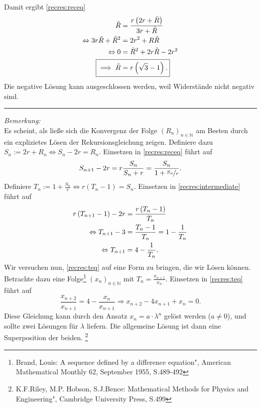 \documentclass[a4paper]{article}
\numberwithin{equation}{Exercise}
\numberwithin{figure}{Exercise}
\begin{document}
\begin{Answer}[ref = recres]
	Damit ergibt \eqref{recres:receq}
	\begin{align*}
	\tilde{R}  &= \frac{r\left(2r+\tilde{R}\right)}{3r+\tilde{R}}\\
	\Leftrightarrow 3r\tilde{R} + \tilde{R}^2 &= 2r^2 + R\tilde{R}\\
	\Leftrightarrow 0&=\tilde{R}^2 + 2r\tilde{R} - 2r^2 \\
	\Aboxed{\implies \tilde{R} &= r\left(\sqrt{3}-1\right).}
	\end{align*}
	Die negative Lösung kann ausgeschlossen werden, weil Widerstände nicht negativ sind.\\
	\noindent\rule{\textwidth}{.75pt}
	\textit{Bemerkung:} \\
	Es scheint, als ließe sich die Konvergenz der Folge $\left(R_n\right)_{n\in \mathbb{N}}$ am Besten durch ein explizietes Lösen der Rekursionsgleichung zeigen.
	Definiere dazu $S_n := 2r + R_n \Leftrightarrow S_n - 2r = R_n$. Einsetzen in \eqref{recres:receq} führt auf 
	\begin{equation}\label{recres:intermediate}
	S_{n+1} - 2r = r\frac{S_n}{S_n+r} = \frac{S_n}{1+\nicefrac{S_n}{r}}.
	\end{equation}
	Definiere $T_n := 1+\frac{S_n}{r} \Leftrightarrow r\left(T_n-1\right) = S_n$. Einsetzen in \eqref{recres:intermediate} führt auf 
	\begin{align}\label{recres:teq}
	r\left(T_{n+1}-1\right) - 2r &= \frac{r\left(T_n-1\right)}{T_n}\notag\\
	\Leftrightarrow T_{n+1}-3 &= \frac{T_n-1}{T_n} = 1 -\frac{1}{T_n}\notag\\
	\Leftrightarrow T_{n+1} &= 4 - \frac{1}{T_n}.
	\end{align}
	Wir versuchen nun, \eqref{recres:teq} auf eine Form zu bringen, die wir Lösen können. Betrachte dazu eine Folge\footnote[2]{Brand, Louis: \glqq A sequence defined by a difference equation", American Mathematical Monthly 62, September 1955, S.489-492} $\left(x_n\right)_{n\in \mathbb{N}}$ mit $T_n = \frac{x_{n+1}}{x_n}$. Einsetzen in \eqref{recres:teq} führt auf 
	\begin{equation}
	\frac{x_{n+2}}{x_{n+1}} = 4 - \frac{x_n}{x_{n+1}} \Rightarrow x_{n+2} - 4x_{n+1} + x_{n} = 0.
	\end{equation}
	Diese Gleichung kann durch den Ansatz $x_n = a\cdot \lambda^n$ gelöst werden ($a\neq 0$), und sollte zwei Lösungen für $\lambda$ liefern. Die allgemeine Lösung ist dann eine Superposition der beiden. \footnote[3]{K.F.Riley, M.P. Hobson, S.J.Bence: \glqq Mathematical Methods for Physics and Engineering", Cambridge University Press, S.499}

\end{Answer}
\end{document}
